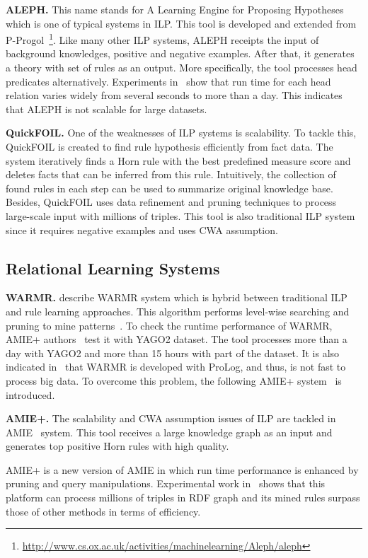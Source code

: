 \textbf{ALEPH.} This name stands for A Learning Engine for Proposing Hypotheses which is one of typical systems in ILP. This tool is developed and extended from P-Progol~\footnote{\url{http://www.cs.ox.ac.uk/activities/machinelearning/Aleph/aleph}}. Like many other ILP systems, ALEPH receipts the input of background knowledges, positive and negative examples. After that, it generates a theory with set of rules as an output. More specifically, the tool processes head predicates alternatively. Experiments in~\cite{ref10} show that run time for each head relation varies widely from several seconds to more than a day. This indicates that ALEPH is not scalable for large datasets.

\textbf{QuickFOIL.} One of the weaknesses of ILP systems is scalability. To tackle this, QuickFOIL is created to find rule hypothesis efficiently from fact data. The system iteratively finds a Horn rule with the best predefined measure score and deletes facts that can be inferred from this rule. Intuitively, the collection of found rules in each step can be used to summarize original knowledge base. Besides, QuickFOIL uses data refinement and pruning techniques to process large-scale input with millions of triples. This tool is also traditional ILP system since it requires negative examples and uses CWA assumption.

\subsection{Relational Learning Systems}

\textbf{WARMR.} \cite{ref16, ref17} describe WARMR system which is hybrid between traditional ILP and rule learning approaches. This algorithm performs level-wise searching and pruning to mine patterns~\cite{ref10}. To check the runtime performance of WARMR, AMIE+ authors~\cite{ref10} test it with YAGO2 dataset. The tool processes more than a day with YAGO2 and more than 15 hours with part of the dataset. It is also indicated in~\cite{ref10} that WARMR is developed with ProLog, and thus, is not fast to process big data. To overcome this problem, the following AMIE+ system~\cite{ref10} is introduced.

\textbf{AMIE+.} The scalability and CWA assumption issues of ILP are tackled in AMIE~\cite{ref10} system. This tool receives a large knowledge graph as an input and generates top positive Horn rules with high quality.

AMIE+ is a new version of AMIE in which run time performance is enhanced by pruning and query manipulations. Experimental work in~\cite{ref10} shows that this platform can process millions of triples in RDF graph and its mined rules surpass those of other methods in terms of efficiency.

